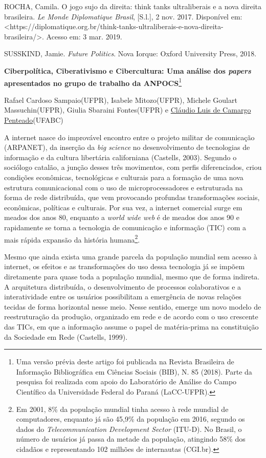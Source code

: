 ROCHA, Camila. O jogo sujo da direita: think tanks ultraliberais e a
nova direita brasileira. \emph{Le Monde Diplomatique Brasil},
{[}S.l.{]}, 2 nov. 2017. Disponível em:
\textless{}https://diplomatique.org.br/think-tanks-ultraliberais-e-nova-direita-brasileira/\textgreater{}.
Acesso em: 3 mar. 2019.

SUSSKIND, Jamie. \emph{Future Politics}. Nova Iorque: Oxford University
Press, 2018.

\textbf{Ciberpolítica, Ciberativismo e Cibercultura: Uma análise dos
\emph{papers} apresentados no grupo de trabalho da ANPOCS}\footnote{Uma
  versão prévia deste artigo foi publicada na Revista Brasileira de
  Informação Bibliográfica em Ciências Sociais (BIB), N. 85 (2018).
  Parte da pesquisa foi realizada com apoio do Laboratório de Análise do
  Campo Científico da Universidade Federal do Paraná (LaCC-UFPR).}

Rafael Cardoso Sampaio(UFPR), Isabele Mitozo(UFPR), Michele Goulart
Massuchin(UFPR), Giulia Sbaraini Fontes(UFPR) e
\href{http://cecs.ufabc.edu.br/index.php/docentes/contatos/23-docentes/41-claudio-luis-de-camargo-penteado.html}{Cláudio
Luis de Camargo Penteado}(UFABC)

A internet nasce do improvável encontro entre o projeto militar de
comunicação (ARPANET), da inserção da \emph{big science} no
desenvolvimento de tecnologias de informação e da cultura libertária
californiana (Castells, 2003). Segundo o sociólogo catalão, a junção
desses três movimentos, com perfis diferenciados, criou condições
econômicas, tecnológicas e culturais para a formação de uma nova
estrutura comunicacional com o uso de microprocessadores e estruturada
na forma de rede distribuída, que vem provocando profundas
transformações sociais, econômicas, políticas e culturais. Por sua vez,
a internet comercial surge em meados dos anos 80, enquanto a \emph{world
wide web} é de meados dos anos 90 e rapidamente se torna a tecnologia de
comunicação e informação (TIC) com a mais rápida expansão da história
humana\footnote{Em 2001, 8\% da população mundial tinha acesso à rede
  mundial de computadores, enquanto já são 45,9\% da população em 2016,
  segundo os dados do \emph{Telecommunication Development Sector}
  (ITU-D). No Brasil, o número de usuários já passa da metade da
  população, atingindo 58\% dos cidadãos e representando 102 milhões de
  internautas (CGI.br).}.

Mesmo que ainda exista uma grande parcela da população mundial sem
acesso à internet, os efeitos e as transformações do uso dessa
tecnologia já se impõem diretamente para quase toda a população mundial,
mesmo que de forma indireta. A arquitetura distribuída, o
desenvolvimento de processos colaborativos e a interatividade entre os
usuários possibilitam a emergência de novas relações tecidas de forma
horizontal nesse meio. Nesse sentido, emerge um novo modelo de
reestruturação da produção, organizado em rede e de acordo com o uso
crescente das TICs, em que a informação assume o papel de matéria-prima
na constituição da Sociedade em Rede (Castells, 1999).

